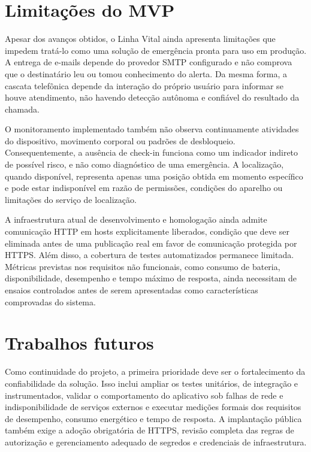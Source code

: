 \section{Limitações do MVP}

Apesar dos avanços obtidos, o Linha Vital ainda apresenta limitações que impedem tratá-lo como uma solução de emergência pronta para uso em produção. A entrega de e-mails depende do provedor SMTP configurado e não comprova que o destinatário leu ou tomou conhecimento do alerta. Da mesma forma, a cascata telefônica depende da interação do próprio usuário para informar se houve atendimento, não havendo detecção autônoma e confiável do resultado da chamada.

O monitoramento implementado também não observa continuamente atividades do dispositivo, movimento corporal ou padrões de desbloqueio. Consequentemente, a ausência de check-in funciona como um indicador indireto de possível risco, e não como diagnóstico de uma emergência. A localização, quando disponível, representa apenas uma posição obtida em momento específico e pode estar indisponível em razão de permissões, condições do aparelho ou limitações do serviço de localização.

A infraestrutura atual de desenvolvimento e homologação ainda admite comunicação HTTP em hosts explicitamente liberados, condição que deve ser eliminada antes de uma publicação real em favor de comunicação protegida por HTTPS. Além disso, a cobertura de testes automatizados permanece limitada. Métricas previstas nos requisitos não funcionais, como consumo de bateria, disponibilidade, desempenho e tempo máximo de resposta, ainda necessitam de ensaios controlados antes de serem apresentadas como características comprovadas do sistema.

\section{Trabalhos futuros}

Como continuidade do projeto, a primeira prioridade deve ser o fortalecimento da confiabilidade da solução. Isso inclui ampliar os testes unitários, de integração e instrumentados, validar o comportamento do aplicativo sob falhas de rede e indisponibilidade de serviços externos e executar medições formais dos requisitos de desempenho, consumo energético e tempo de resposta. A implantação pública também exige a adoção obrigatória de HTTPS, revisão completa das regras de autorização e gerenciamento adequado de segredos e credenciais de infraestrutura.

